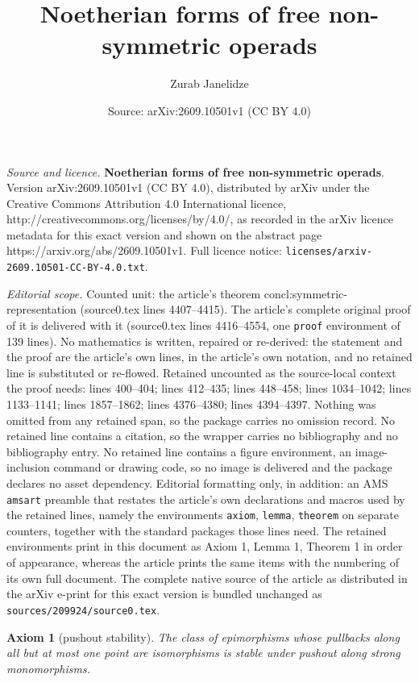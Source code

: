\documentclass[10pt,a4paper]{amsart}
\title{\textbf{Noetherian forms of free non-symmetric operads}}
\author{Zurab Janelidze}
\date{Source: arXiv:2609.10501v1 (CC BY 4.0)}
\newtheorem{axiom}{Axiom}
\begin{document}
\maketitle

\noindent\emph{Source and licence.} \textbf{Noetherian forms of free non-symmetric operads}. Version arXiv:2609.10501v1 (CC BY 4.0), distributed by arXiv under the Creative Commons Attribution 4.0 International licence, http://creativecommons.org/licenses/by/4.0/, as recorded in the arXiv licence metadata for this exact version and shown on the abstract page https://arxiv.org/abs/2609.10501v1. Full licence notice: \texttt{licenses/arxiv-2609.10501-CC-BY-4.0.txt}.\par\smallskip

\noindent\textit{Editorial scope.} Counted unit: the article's theorem concl:symmetric-representation (source0.tex lines 4407--4415). The article's complete original proof of it is delivered with it (source0.tex lines 4416--4554, one \texttt{proof} environment of 139 lines). No mathematics is written, repaired or re-derived: the statement and the proof are the article's own lines, in the article's own notation, and no retained line is substituted or re-flowed.  Retained uncounted as the source-local context the proof needs: lines 400--404; lines 412--435; lines 448--458; lines 1034--1042; lines 1133--1141; lines 1857--1862; lines 4376--4380; lines 4394--4397.  Nothing was omitted from any retained span, so the package carries no omission record.  No retained line contains a citation, so the wrapper carries no bibliography and no bibliography entry.  No retained line contains a figure environment, an image-inclusion command or drawing code, so no image is delivered and the package declares no asset dependency.  Editorial formatting only, in addition: an AMS \texttt{amsart} preamble that restates the article's own declarations and macros used by the retained lines, namely the environments \texttt{axiom}, \texttt{lemma}, \texttt{theorem} on separate counters, together with the standard packages those lines need.  The retained environments print in this document as Axiom 1, Lemma 1, Theorem 1 in order of appearance, whereas the article prints the same items with the numbering of its own full document.  The complete native source of the article as distributed in the arXiv e-print for this exact version is bundled unchanged as \texttt{sources/209924/source0.tex}.
\begin{axiom}[pushout stability]\label{ax:pointpushout}
The class of epimorphisms whose pullbacks along all but at most one
point are isomorphisms is stable under pushout along strong
monomorphisms.
\end{axiom}
\end{document}
